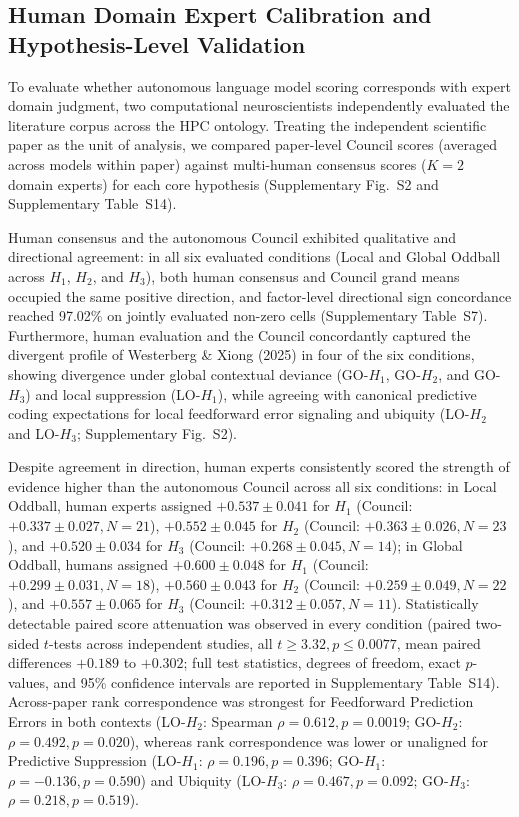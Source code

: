 \documentclass[12pt]{article}
\begin{document}
\subsection{Human Domain Expert Calibration and Hypothesis-Level Validation}\label{human-domain-expert-calibration}

To evaluate whether autonomous language model scoring corresponds with expert domain judgment, two computational neuroscientists independently evaluated the literature corpus across the HPC ontology. Treating the independent scientific paper as the unit of analysis, we compared paper-level Council scores (averaged across models within paper) against multi-human consensus scores ($K=2$ domain experts) for each core hypothesis (Supplementary Fig.~S2 and Supplementary Table~S14).

Human consensus and the autonomous Council exhibited qualitative and directional agreement: in all six evaluated conditions (Local and Global Oddball across $H_1$, $H_2$, and $H_3$), both human consensus and Council grand means occupied the same positive direction, and factor-level directional sign concordance reached 97.02\% on jointly evaluated non-zero cells (Supplementary Table~S7). Furthermore, human evaluation and the Council concordantly captured the divergent profile of Westerberg \& Xiong (2025) in four of the six conditions, showing divergence under global contextual deviance (GO-$H_1$, GO-$H_2$, and GO-$H_3$) and local suppression (LO-$H_1$), while agreeing with canonical predictive coding expectations for local feedforward error signaling and ubiquity (LO-$H_2$ and LO-$H_3$; Supplementary Fig.~S2).

Despite agreement in direction, human experts consistently scored the strength of evidence higher than the autonomous Council across all six conditions: in Local Oddball, human experts assigned $+0.537 \pm 0.041$ for $H_1$ (Council: $+0.337 \pm 0.027, N=21$), $+0.552 \pm 0.045$ for $H_2$ (Council: $+0.363 \pm 0.026, N=23$), and $+0.520 \pm 0.034$ for $H_3$ (Council: $+0.268 \pm 0.045, N=14$); in Global Oddball, humans assigned $+0.600 \pm 0.048$ for $H_1$ (Council: $+0.299 \pm 0.031, N=18$), $+0.560 \pm 0.043$ for $H_2$ (Council: $+0.259 \pm 0.049, N=22$), and $+0.557 \pm 0.065$ for $H_3$ (Council: $+0.312 \pm 0.057, N=11$). Statistically detectable paired score attenuation was observed in every condition (paired two-sided $t$-tests across independent studies, all $t \ge 3.32, p \le 0.0077$, mean paired differences $+0.189$ to $+0.302$; full test statistics, degrees of freedom, exact $p$-values, and 95\% confidence intervals are reported in Supplementary Table~S14). Across-paper rank correspondence was strongest for Feedforward Prediction Errors in both contexts (LO-$H_2$: Spearman $\rho = 0.612, p = 0.0019$; GO-$H_2$: $\rho = 0.492, p = 0.020$), whereas rank correspondence was lower or unaligned for Predictive Suppression (LO-$H_1$: $\rho = 0.196, p = 0.396$; GO-$H_1$: $\rho = -0.136, p = 0.590$) and Ubiquity (LO-$H_3$: $\rho = 0.467, p = 0.092$; GO-$H_3$: $\rho = 0.218, p = 0.519$).
\end{document}

